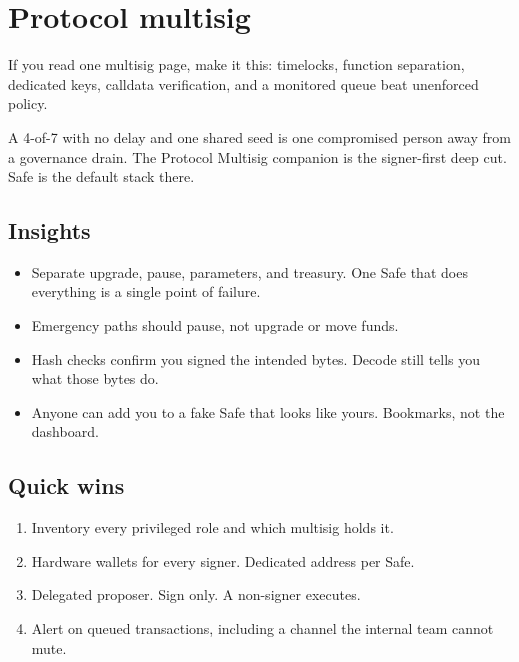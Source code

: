 \chapter{Protocol multisig}

If you read one multisig page, make it this: timelocks,
function separation, dedicated keys, calldata
verification, and a monitored queue beat unenforced
policy.

A 4-of-7 with no delay and one shared seed is one
compromised person away from a governance drain. The
Protocol Multisig companion is the signer-first deep
cut. Safe is the default stack there.

\section{Insights}

\begin{itemize}
  \item Separate upgrade, pause, parameters, and
  treasury. One Safe that does everything is a single
  point of failure.
  \item Emergency paths should pause, not upgrade or
  move funds.
  \item Hash checks confirm you signed the intended
  bytes. Decode still tells you what those bytes do.
  \item Anyone can add you to a fake Safe that looks
  like yours. Bookmarks, not the dashboard.
\end{itemize}

\section{Quick wins}

\begin{enumerate}
  \item Inventory every privileged role and which
  multisig holds it.
  \item Hardware wallets for every signer. Dedicated
  address per Safe.
  \item Delegated proposer. Sign only. A non-signer
  executes.
  \item Alert on queued transactions, including a
  channel the internal team cannot mute.
\end{enumerate}
